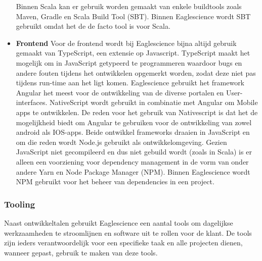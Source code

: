 \begin{itemize}
\begin{itemize}
    \end{itemize} Binnen Scala kan er gebruik worden gemaakt van enkele buildtools zoals Maven, Gradle en Scala Build Tool (SBT). Binnen Eaglescience wordt SBT gebruikt omdat het de de facto tool is voor Scala.
    \item \textbf{Frontend}
    Voor de frontend wordt bij Eaglescience bijna altijd gebruik gemaakt van TypeScript, een extensie op Javascript. TypeScript maakt het mogelijk om in JavaScript getypeerd te programmeren waardoor bugs en andere fouten tijdens het ontwikkelen opgemerkt worden, zodat deze niet pas tijdens run-time aan het ligt komen. Eaglescience gebruikt het framework Angular het meest voor de ontwikkeling van de diverse portalen en User-interfaces. NativeScript wordt gebruikt in combinatie met Angular om Mobile apps te ontwikkelen. De reden voor het gebruik van Nativescript is dat het de mogelijkheid biedt om Angular te gebruiken voor de ontwikkeling van zowel android als IOS-apps. Beide ontwikkel frameworks draaien in JavaScript en om die reden wordt Node.js gebruikt als ontwikkelomgeving. Gezien JavaScript niet gecompileerd en dus niet gebuild wordt (zoals in Scala) is er alleen een voorziening voor dependency management in de vorm van onder andere Yarn en Node Package Manager (NPM). Binnen Eaglescience wordt NPM gebruikt voor het beheer van dependencies in een project.
\end{itemize}

\subsubsection{Tooling}\label{subsubsec:tooling}
Naast ontwikkeltalen gebruikt Eaglescience een aantal tools om dagelijkse werkzaamheden te stroomlijnen en software uit te rollen voor de klant. De tools zijn ieders verantwoordelijk voor een specifieke taak en alle projecten dienen, wanneer gepast, gebruik te maken van deze tools.


